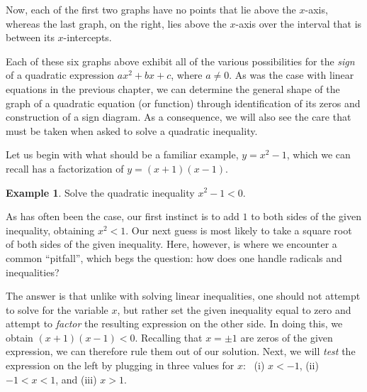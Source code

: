 \documentclass[12pt]{book}
\theoremstyle{definition}
\newtheorem{example}{Example}
\begin{document}
\begin{center}
\end{center}
Now, each of the first two graphs have no points that lie above the $x$-axis, whereas the last graph, on the right, lies above the $x$-axis over the interval that is between its $x$-intercepts.\par
Each of these six graphs above exhibit all of the various possibilities for the {\it sign} of a quadratic expression $ax^2+bx+c$, where $a\neq 0$.  As was the case with linear equations in the previous chapter, we can determine the general shape of the graph of a quadratic equation (or function) through identification of its zeros and construction of a sign diagram.  As a consequence, we will also see the care that must be taken when asked to solve a quadratic inequality.\par
Let us begin with what should be a familiar example, $y=x^2-1$, which we can recall has a factorization of $y=(x+1)(x-1)$.
\begin{example}
Solve the quadratic inequality $x^2-1<0$.
\end{example}
As has often been the case, our first instinct is to add $1$ to both sides of the given inequality, obtaining $x^2< 1$.  Our next guess is most likely to take a square root of both sides of the given inequality.  Here, however, is where we encounter a common ``pitfall'', which begs the question: how does one handle radicals and inequalities?\par
The answer is that unlike with solving linear inequalities, one should not attempt to solve for the variable $x$, but rather set the given inequality equal to zero and attempt to {\it factor} the resulting expression on the other side.  In doing this, we obtain $(x+1)(x-1)<0$.  Recalling that $x=\pm 1$ are zeros of the given expression, we can therefore rule them out of our solution.  Next, we will {\it test} the expression on the left by plugging in three values for $x$: \ (i) $x<-1$, (ii) $-1<x<1$, and (iii) $x>1$.
\end{document}
